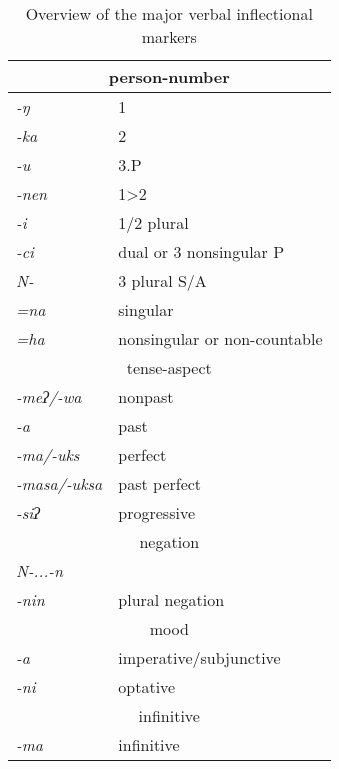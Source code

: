 \begin{table}[p]
\begin{centering}
\begin{tabular}{ll}
\toprule
\multicolumn{2}{c}{ {\sc person-number}}\\
\midrule
\emph{-ŋ}&1\\
\emph{-ka}&2\\
\emph{-u}&3.P\\
\emph{-nen}&1>2\\
\emph{-i}&1/2 plural\\
\emph{-ci}&dual  or 3 nonsingular P \\
\emph{N-}&3 plural S/A\\
\emph{=na}&singular\\
\emph{=ha}&nonsingular or non-countable\\
\midrule
\multicolumn{2}{c}{ {\sc tense-aspect}}\\
\midrule
\emph{-meʔ/-wa}&nonpast\\
\emph{-a}&past\\
\emph{-ma/-uks}&perfect\\
\emph{-masa/-uksa}&past perfect\\
\emph{-siʔ}&progressive\\
\midrule
\multicolumn{2}{c}{ {\sc negation}}\\
\midrule
\emph{N-...-n}&\\
\emph{-nin}&plural negation\\
\midrule
\multicolumn{2}{c}{ {\sc mood}}\\
\midrule
\emph{-a}&imperative/subjunctive\\
\emph{-ni}&optative\\
\midrule
\multicolumn{2}{c}{ {\sc infinitive}}\\
\midrule
\emph{-ma}&infinitive\\
\bottomrule
\end{tabular}\\
\caption{Overview of the major verbal inflectional markers}\label{abc}
\end{centering}
\end{table} 

\pagestyle{empty}

